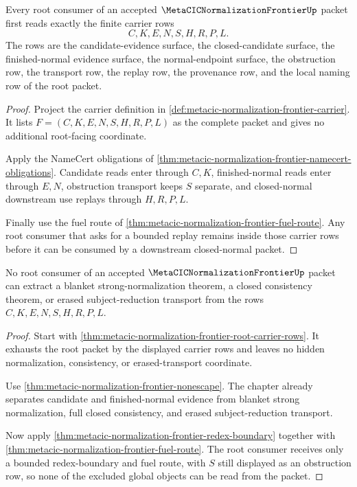 \begin{theorem}
\label{thm:metacic-normalization-frontier-root-carrier-rows}
Every root consumer of an accepted $\MetaCICNormalizationFrontierUp$ packet first reads exactly the finite carrier rows
$$
C,K,E,N,S,H,R,P,L.
$$
The rows are the candidate-evidence surface, the closed-candidate surface, the finished-normal evidence surface, the normal-endpoint surface, the obstruction row, the transport row, the replay row, the provenance row, and the local naming row of the root packet.
\end{theorem}
\begin{proof}
Project the carrier definition in \autoref{def:metacic-normalization-frontier-carrier}. It lists $F=(C,K,E,N,S,H,R,P,L)$ as the complete packet and gives no additional root-facing coordinate.

Apply the NameCert obligations of \autoref{thm:metacic-normalization-frontier-namecert-obligations}. Candidate reads enter through $C,K$, finished-normal reads enter through $E,N$, obstruction transport keeps $S$ separate, and closed-normal downstream use replays through $H,R,P,L$.

Finally use the fuel route of \autoref{thm:metacic-normalization-frontier-fuel-route}. Any root consumer that asks for a bounded replay remains inside those carrier rows before it can be consumed by a downstream closed-normal packet.
\end{proof}

\begin{theorem}
\label{thm:metacic-normalization-frontier-root-consumer-nonescape}
No root consumer of an accepted $\MetaCICNormalizationFrontierUp$ packet can extract a blanket strong-normalization theorem, a closed consistency theorem, or erased subject-reduction transport from the rows $C,K,E,N,S,H,R,P,L$.
\end{theorem}
\begin{proof}
Start with \autoref{thm:metacic-normalization-frontier-root-carrier-rows}. It exhausts the root packet by the displayed carrier rows and leaves no hidden normalization, consistency, or erased-transport coordinate.

Use \autoref{thm:metacic-normalization-frontier-nonescape}. The chapter already separates candidate and finished-normal evidence from blanket strong normalization, full closed consistency, and erased subject-reduction transport.

Now apply \autoref{thm:metacic-normalization-frontier-redex-boundary} together with \autoref{thm:metacic-normalization-frontier-fuel-route}. The root consumer receives only a bounded redex-boundary and fuel route, with $S$ still displayed as an obstruction row, so none of the excluded global objects can be read from the packet.
\end{proof}

